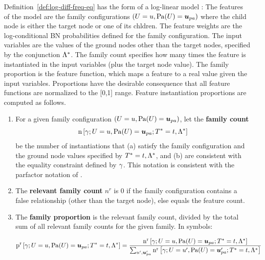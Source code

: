 \documentclass[runningheads,a4paper]{llncs}
\renewcommand{\Qconj}{\Appendterm{\FG{\TT} = \TV} {\QC}} %
\begin{document}
Definition~\ref{def:log-diff-freq-eq} has the form of a log-linear model \cite{Sutton2007}: The features of the model are the family configurations $(\Appendterm{\UT  = \UV} {\Pa{\UT} = \Prange{\UT}})$ 
where the child node is either the target node or one of its chldren. The feature weights are the log-conditional BN probabilities defined for the family configuration. The input variables are the values of the ground nodes other than the target nodes, specified by the conjunction $\Lambda^{*}\hspace{0.0ex}$. The family count specifies how many times the feature is instantiated in the input variables (plus the target node value). The family proportion is the feature function, which maps a feature to a real value given the input variables. 
Proportions have the desirable consequence that all feature functions are normalized to the [0,1] range. Feature instantiation proportions are computed as follows. 

\begin{enumerate}
\item For a given family configuration $(\Appendterm{\UT  = \UV} {\Pa{\UT} = \Prange{\UT}})$, let the \textbf{family  count} $$\Count{\Appendterm{\grounding;\UT  = \UV} {\Pa{\UT} = \Prange{\UT}}} {\Qconj}$$ be the number of instantiations that (a) satisfy the family configuration and the ground node values specified by $\Qconj$, and (b) are consistent with the equality constraint defined by $\gamma$. This notation is consistent with the parfactor notation of \cite{Poole2003}. 
\item The \textbf{relevant family count} $n^{r}$ is 0 if the family configuration contains a false relationship (other than the target node), else equals the feature count.
\item The \textbf{family proportion} is the relevant family count, divided by the total sum of all relevant family counts for the given family. In symbols:

\begin{equation} \notag
 \Relfreq{\Appendterm{\grounding;\UT  = \UV} {\Pa{\UT} = \Prange{\UT}}} {\Qconj} = \frac{\Relcount{\Appendterm{\grounding;\UT  = \UV} {\Pa{\UT} = \Prange{\UT}}} {\Qconj}}{\sum_{\UV',\Prange{\UT}'}\Relcount{\Appendterm{\grounding;\UT  = \UV'} {\Pa{\UT} = \Prange{\UT}'}} {\Qconj}}
\end{equation}
\end{enumerate}
\end{document}
